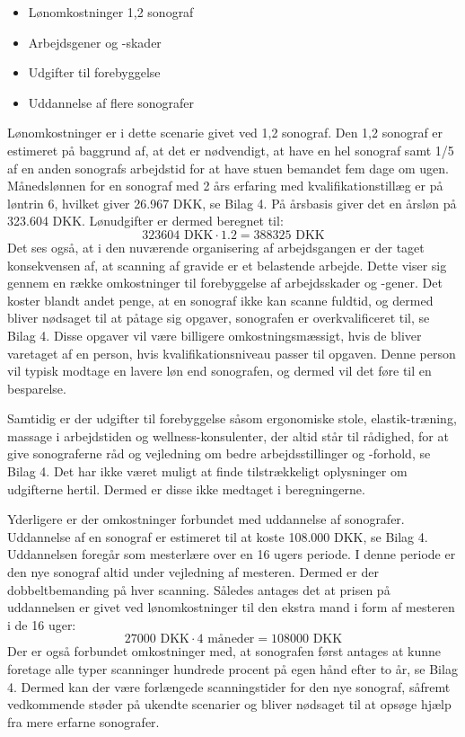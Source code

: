 \begin{itemize}
\item Lønomkostninger 1,2 sonograf
\item Arbejdsgener og -skader
\item Udgifter til forebyggelse
\item Uddannelse af flere sonografer
\end{itemize}
Lønomkostninger er i dette scenarie givet ved 1,2 sonograf. Den 1,2 sonograf er estimeret på baggrund af, at det er nødvendigt, at have en hel sonograf samt 1/5 af en anden sonografs arbejdstid for at have stuen bemandet fem dage om ugen. Månedslønnen for en sonograf med 2 års erfaring med kvalifikationstillæg er på løntrin 6, hvilket giver 26.967 DKK, se Bilag 4. På årsbasis giver det en årsløn på 323.604 DKK. Lønudgifter er dermed beregnet til:
\begin{equation}
323604 \text{ DKK}\cdot1.2 = 388325 \text{ DKK}
\end{equation}
Det ses også, at i den nuværende organisering af arbejdsgangen er der taget konsekvensen af, at scanning af gravide er et belastende arbejde. Dette viser sig gennem en række omkostninger til forebyggelse af arbejdsskader og -gener. Det koster blandt andet penge, at en sonograf ikke kan scanne fuldtid, og dermed bliver nødsaget til at påtage sig opgaver, sonografen er overkvalificeret til, se Bilag 4. Disse opgaver vil være billigere omkostningsmæssigt, hvis de bliver varetaget af en person, hvis kvalifikationsniveau passer til opgaven. Denne person vil typisk modtage en lavere løn end sonografen, og dermed vil det føre til en besparelse.

Samtidig er der udgifter til forebyggelse såsom ergonomiske stole, elastik-træning, massage i arbejdstiden og wellness-konsulenter, der altid står til rådighed, for at give sonograferne råd og vejledning om bedre arbejdsstillinger og -forhold, se Bilag 4. Det har ikke været muligt at finde tilstrækkeligt oplysninger om udgifterne hertil. Dermed er disse ikke medtaget i beregningerne. 

Yderligere er der omkostninger forbundet med uddannelse af sonografer. Uddannelse af en sonograf er estimeret til at koste 108.000 DKK, se Bilag 4. Uddannelsen foregår som mesterlære over en 16 ugers periode. I denne periode er den nye sonograf altid under vejledning af mesteren. Dermed er der dobbeltbemanding på hver scanning. Således antages det at prisen på uddannelsen er givet ved lønomkostninger til den ekstra mand i form af mesteren i de 16 uger:
\begin{equation}
27000 \text{ DKK}\cdot4 \text{ måneder} = 108000 \text{ DKK}
\end{equation}
Der er også forbundet omkostninger med, at sonografen først antages at kunne foretage alle typer scanninger hundrede procent på egen hånd efter to år, se Bilag 4. Dermed kan der være forlængede scanningstider for den nye sonograf, såfremt vedkommende støder på ukendte scenarier og bliver nødsaget til at opsøge hjælp fra mere erfarne sonografer.


